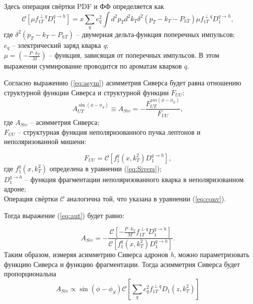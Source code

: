 \documentclass{extreport}
\begin{document}
Здесь операция свёртки PDF и ФФ определяется как
\begin{equation}
	\label{eq:conv}
	\mathcal{C} [\mu f_{1T}^{\perp q}D_1^{q \rightarrow h}] = x \sum_{q} e_q^2 \int d^2 p_{T} d^2 k_{T} \delta^2(p_T - k_T - P_{hT}) \mu f_{1T}^{\perp q}D_1^{q \rightarrow h}, 
\end{equation}
где $\delta^2 (p_T - k_T - P_{hT})$ -- двумерная дельта-функция поперечных импульсов; \\ 
$e_q$ -- электрический заряд кварка \textit{q}; \\
$\mu =  (-\frac{P\cdot k_T}{M})$ -- функция, зависящая от поперечных импульсов. В этом выражении суммирование проводится по ароматам кварков $q$. 

Согласно выражению (\ref{eq:asym}) асимметрия Сиверса будет равна отношению структурной функции Сиверса и структурной функции $F_{UU}$: 
\begin{equation}
	\label{eq:aut}
	A_{UT}^{\sin(\phi-\phi_S)} \equiv A_{Siv} = - \frac{F^{sin(\phi-\phi_S)}_{UT}}{F_{UU}}, 
\end{equation}
где $A_{Siv}$ -- асимметрия Сиверса; \\
$F_{UU}$ -- структурная функция неполяризованного пучка лептонов и неполяризованной мишени:

\begin{equation}
	F_{UU} = \mathcal{C} \left[f_1^q (x,k^2_T ) D_1^{q \rightarrow h} \right],
\end{equation}
где $f_1^q (x,k^2_T )$ определена в уравнении (\ref{eq:Sivers}); \\
$D_1^{q \rightarrow h}$ -- функция фрагментации неполяризованного кварка в неполяризованном адроне; \\
Операция свёртки $\mathcal{C}$ аналогична той, что указана в уравнении (\ref{eq:conv}).

Тогда выражение (\ref{eq:aut}) будет равно:

\begin{equation}
	A_{Siv} = - \frac{\mathcal{C}\left [-\frac{P\cdot k_T}{M}f_{1T}^{\perp q}D_1^{q \rightarrow h} \right]}{\mathcal{C} \left[f_1^q (x,k^2_T ) D_1^{q \rightarrow h} \right]}.
\end{equation}
Таким образом, измеряя асимметрию Сиверса адронов \textit{h}, можно параметризовать функцию Сиверса и функцию фрагментации. 
Тогда асимметрия Сиверса будет пропорциональна
\begin{equation}
	A_{Siv} \propto \sin(\phi-\phi_S)\mathcal{C}  \left [ \sum_q e_q^2 f_{1T}^{\perp q} D_1(z, k_T^2) \right] 
\end{equation}
\end{document}
